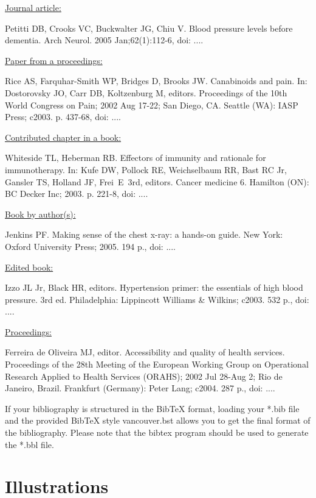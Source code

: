 \documentclass{IOS-Book-Article}
\begin{document}
\medskip
\noindent\ul{Journal article:}\par\noindent
Petitti DB, Crooks VC, Buckwalter JG, Chiu V. Blood pressure levels before dementia.
Arch Neurol. 2005 Jan;62(1):112-6, doi: ....

\medskip
\noindent\ul{Paper from a proceedings:}\par\noindent
Rice AS, Farquhar-Smith WP, Bridges D, Brooks JW. Canabinoids and pain. In: Dostorovsky
JO, Carr DB, Koltzenburg M, editors. Proceedings of the 10th World Congress on Pain;
2002 Aug 17-22; San Diego, CA. Seattle (WA): IASP Press; c2003. p. 437-68, doi: ....

\medskip
\noindent\ul{Contributed chapter in a book:}\par\noindent
Whiteside TL, Heberman RB. Effectors of immunity and rationale for immunotherapy. In:
Kufe DW, Pollock RE, Weichselbaum RR, Bast RC Jr, Gansler TS, Holland JF, Frei~E~3rd,
editors. Cancer medicine 6. Hamilton (ON): BC Decker Inc; 2003. p. 221-8, doi: ....

\smallskip
\noindent\ul{Book by author(s):}\par\noindent
Jenkins PF. Making sense of the chest x-ray: a hands-on guide. New York: Oxford
University Press; 2005. 194 p., doi: ....

\smallskip
\noindent\ul{Edited book:}\par\noindent
Izzo JL Jr, Black HR, editors. Hypertension primer: the essentials of high blood pressure.
3rd ed. Philadelphia: Lippincott Williams \& Wilkins; c2003. 532 p., doi: ....

\smallskip
\noindent\ul{Proceedings:}\par\noindent
Ferreira de Oliveira MJ, editor. Accessibility and quality of health services. Proceedings of
the 28th Meeting of the European Working Group on Operational Research Applied to Health
Services (ORAHS); 2002 Jul 28-Aug 2; Rio de Janeiro, Brazil. Frankfurt (Germany): Peter Lang;
c2004. 287 p., doi: ....

\vspace*{6pt}
If your bibliography is structured in the BibTeX format, loading your *.bib file and the provided  BibTeX style vancouver.bst allows you to get the final format of the bibliography. Please note that the bibtex program should be used to generate the *.bbl file.

\section{Illustrations}
\end{document}

